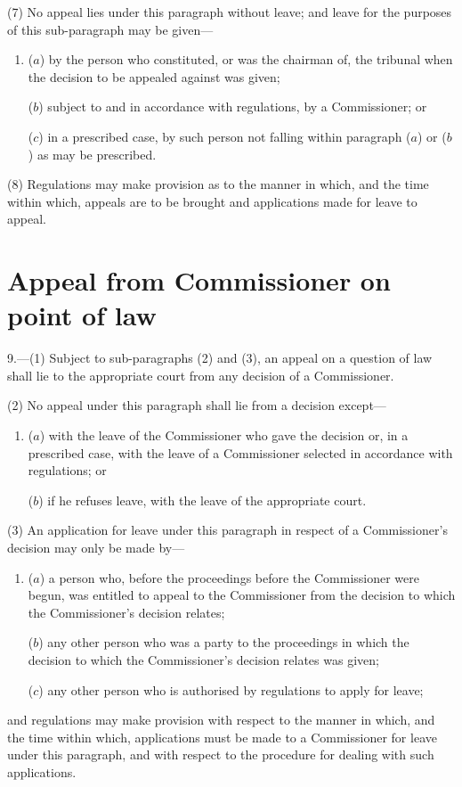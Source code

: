 \documentclass[12pt,a4paper]{article}
\begin{document}
(7) No appeal lies under this paragraph without leave; and leave for the purposes of this sub-paragraph may be given—
\begin{enumerate}\item[]
($a$) by the person who constituted, or was the chairman of, the tribunal when the decision to be appealed against was given;

($b$) subject to and in accordance with regulations, by a Commissioner; or

($c$) in a prescribed case, by such person not falling within paragraph ($a$)  or ($b$)  as may be prescribed.
\end{enumerate}

(8) Regulations may make provision as to the manner in which, and the time within which, appeals are to be brought and applications made for leave to appeal.

\section*{Appeal from Commissioner on point of law}

9.---(1) Subject to sub-paragraphs (2)  and (3), an appeal on a question of law shall lie to the appropriate court from any decision of a Commissioner.

(2) No appeal under this paragraph shall lie from a decision except—
\begin{enumerate}\item[]
($a$) with the leave of the Commissioner who gave the decision or, in a prescribed case, with the leave of a Commissioner selected in accordance with regulations; or

($b$) if he refuses leave, with the leave of the appropriate court.
\end{enumerate}

(3) An application for leave under this paragraph in respect of a Commissioner’s decision may only be made by—
\begin{enumerate}\item[]
($a$) a person who, before the proceedings before the Commissioner were begun, was entitled to appeal to the Commissioner from the decision to which the Commissioner’s decision relates;

($b$) any other person who was a party to the proceedings in which the decision to which the Commissioner’s decision relates was given;

($c$) any other person who is authorised by regulations to apply for leave;
\end{enumerate}
and regulations may make provision with respect to the manner in which, and the time within which, applications must be made to a Commissioner for leave under this paragraph, and with respect to the procedure for dealing with such applications.
\end{document}
